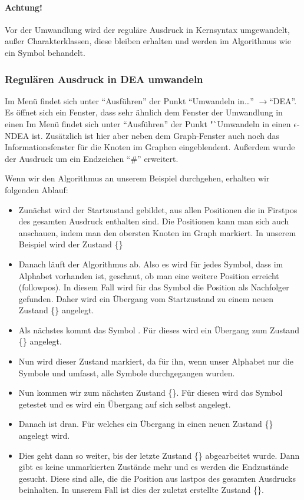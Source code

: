 \paragraph*{Achtung!} Vor der Umwandlung wird der reguläre Ausdruck in Kernsyntax umgewandelt, außer Charakterklassen, diese bleiben erhalten und werden im Algorithmus wie ein Symbol behandelt.


\subsubsection{Regulären Ausdruck in DEA umwandeln}

Im Menü findet sich unter "`Ausführen"' der Punkt "`Umwandeln in\ldots"' $\rightarrow$"`DEA"'. Es öffnet sich ein Fenster, dass sehr ähnlich dem Fenster der Umwandlung in einen Im Menü findet sich unter "`Ausführen"' der Punkt "`Umwandeln in einen $\epsilon$-NDEA ist. Zusätzlich ist hier aber neben dem Graph-Fenster auch noch das Informationsfenster für die Knoten im Graphen eingeblendent. Außerdem wurde der Ausdruck um ein Endzeichen "`\#"' erweitert.

Wenn wir den Algorithmus an unserem Beispiel durchgehen, erhalten wir folgenden Ablauf:

\begin{itemize}
  \item Zunächst wird der Startzustand gebildet, aus allen Positionen die in Firstpos des gesamten Ausdruck enthalten sind. Die Positionen kann man sich auch anschauen, indem man den obersten Knoten im Graph markiert. In unserem Beispiel wird der Zustand \{\}
  \item Danach läuft der Algorithmus ab. Also es wird für jedes Symbol, dass im Alphabet vorhanden ist, geschaut, ob man eine weitere Position erreicht (followpos). In diesem Fall wird für das Symbol  die Position  als Nachfolger gefunden. Daher wird ein Übergang  vom Startzustand zu einem neuen Zustand \{\} angelegt.
  \item Als nächstes kommt das Symbol . Für dieses wird ein Übergang zum Zustand \{\} angelegt.
  \item Nun wird dieser Zustand markiert, da für ihn, wenn unser Alphabet nur die Symbole  und  umfasst, alle Symbole durchgegangen wurden.
  \item Nun kommen wir zum nächsten Zustand \{\}. Für diesen wird das Symbol  getestet und es wird ein Übergang auf sich selbst angelegt.
  \item Danach ist  dran. Für welches ein Übergang in einen neuen Zustand \{\} angelegt wird.
  \item Dies geht dann so weiter, bis der letzte Zustand \{\} abgearbeitet wurde. Dann gibt es keine unmarkierten Zustände mehr und es werden die Endzustände gesucht. Diese sind alle, die die Position aus lastpos des gesamten Ausdrucks beinhalten. In unserem Fall ist dies der zuletzt erstellte Zustand \{\}.
\end{itemize}

